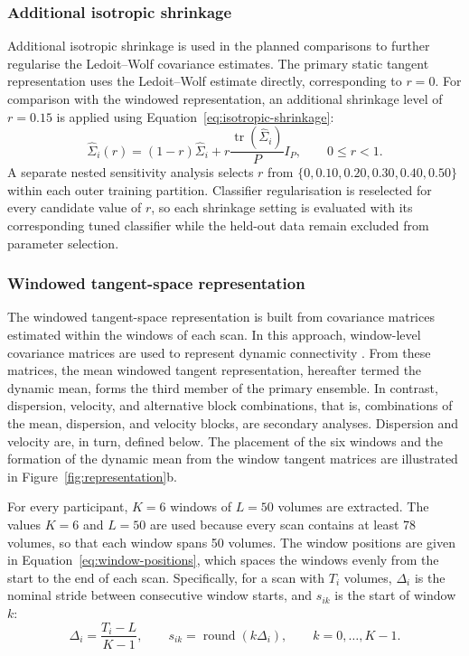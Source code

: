 \subsubsection{Additional isotropic shrinkage}
\label{subsubsec:isotropic-shrinkage}

Additional isotropic shrinkage is used in the planned comparisons to further regularise the
Ledoit--Wolf covariance estimates. The primary static tangent representation uses the
Ledoit--Wolf estimate directly, corresponding to $r=0$. For comparison with the windowed
representation, an additional shrinkage level of $r=0.15$ is applied using
Equation~\eqref{eq:isotropic-shrinkage}:
\begin{equation}
\widehat{\Sigma}_i(r)
=
(1-r)\widehat{\Sigma}_i
+
r\frac{\operatorname{tr}(\widehat{\Sigma}_i)}{P}I_P,
\qquad 0 \leq r < 1.
\label{eq:isotropic-shrinkage}
\end{equation}
A separate nested sensitivity analysis selects $r$ from
$\{0,0.10,0.20,0.30,0.40,0.50\}$ within each outer training partition. Classifier
regularisation is reselected for every candidate value of $r$, so each shrinkage setting
is evaluated with its corresponding tuned classifier while the held-out data remain
excluded from parameter selection.

\subsubsection{Windowed tangent-space representation}
\label{subsubsec:windowed-representation}

The windowed tangent-space representation is built from covariance matrices estimated
within the windows of each scan. In this approach, window-level covariance matrices are used
to represent dynamic connectivity
\citep{Hutchisonetal2013,Allenetal2014,LeonardiVanDeVille2015,Pretietal2017}. From these matrices, the mean windowed tangent representation, hereafter termed the dynamic
mean, forms the third member of the primary ensemble. In contrast, dispersion, velocity, and alternative block combinations, that is,
combinations of the mean, dispersion, and velocity blocks, are secondary analyses.
Dispersion and velocity are, in turn, defined below.
The placement of the six windows and the formation of the dynamic mean from the window
tangent matrices are illustrated in Figure~\ref{fig:representation}b.

For every participant, $K=6$ windows of $L=50$ volumes are extracted. The values $K=6$
and $L=50$ are used because every scan contains at least 78 volumes, so that each window
spans 50 volumes. The window positions are given in Equation~\eqref{eq:window-positions}, which spaces the windows
evenly from the start to the end of each scan. Specifically, for a scan with $T_i$
volumes, $\Delta_i$ is the nominal stride between consecutive window starts, and $s_{ik}$
is the start of window $k$:
\begin{equation}
\Delta_i
=
\frac{T_i-L}{K-1},
\qquad
s_{ik}
=
\operatorname{round}(k\Delta_i),
\qquad
k=0,\ldots,K-1.
\label{eq:window-positions}
\end{equation}

